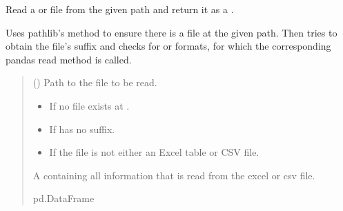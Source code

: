 \documentclass[letterpaper,10pt,english]{sphinxmanual}
\begin{document}
\begin{fulllineitems}
\label{\detokenize{FileHandler:src.FileHandler.read_file}}
\pysigstartsignatures
{}
\pysigstopsignatures
\sphinxAtStartPar
Read a  or  file from the given path and return it as a .

\sphinxAtStartPar
Uses pathlib’s  method to ensure there is a file at the given path.
Then tries to obtain the file’s suffix and checks for  or  formats,
for which the corresponding pandas read method is called.
\begin{quote}\begin{description}
\sphinxAtStartPar
{} () \textendash{} Path to the file to be read.

\begin{itemize}
\item {} 
\sphinxAtStartPar
{} \textendash{} If no file exists at .

\item {} 
\sphinxAtStartPar
{} \textendash{} If  has no suffix.

\item {} 
\sphinxAtStartPar
{} \textendash{} If the file is not either an Excel table or CSV file.

\end{itemize}

\sphinxAtStartPar
A  containing all information that is read from the excel or csv file.

\sphinxAtStartPar
pd.DataFrame

\end{description}\end{quote}

\end{fulllineitems}
\end{document}
